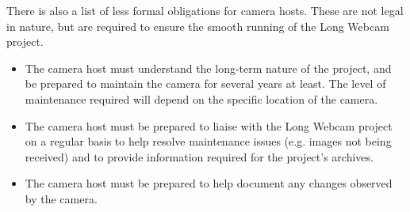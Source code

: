 \documentclass[11pt,a4paper]{article}
\begin{document}
There is also a list of less formal obligations for camera hosts. These are not legal in nature, but are required to ensure the smooth running of the Long Webcam project.

\begin{itemize}
\item The camera host must understand the long-term nature of the project, and be prepared to maintain the camera for several years at least. The level of maintenance required will depend on the specific location of the camera.
\item The camera host must be prepared to liaise with the Long Webcam project on a regular basis to help resolve maintenance issues (e.g. images not being received) and to provide information required for the project's archives.
\item The camera host must be prepared to help document any changes observed by the camera.
\end{itemize}
\end{document}
